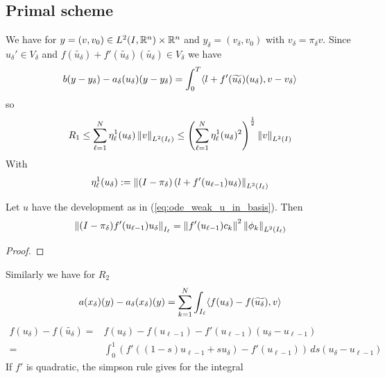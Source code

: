 \documentclass[english,12pt,a4paper]{article}
\begin{document}
\subsection{Primal scheme}\label{subsec:}
%
%
We have for $y=(v,v_0)\in L^2(I,\mathbb R^n) \times \mathbb R^n$ and $y_{\delta}=(v_{\delta},v_0)$ with $v_{\delta} = \pi_{\delta}v$. Since $u_{\delta}'\in V_{\delta}$ and $f(\widetilde{u_{\delta}}) + f'(\widetilde{u_{\delta}})(\widetilde{u_{\delta}})\in V_{\delta}$ we have
%
\begin{align*}
b(y-y_{\delta}) - a_{\delta}(u_{\delta})(y-y_{\delta}) =  \int_{0}^T\langle l  + f'(\widetilde{u_{\delta}})(u_{\delta}),v-v_{\delta}\rangle
\end{align*}
%
so
%
\begin{align*}
R_1 \le \sum_{\ell=1}^N \eta^1_{\ell}(u_{\delta})\left\|v\right\|_{L^2(I_{\ell})} \le \left(\sum_{\ell=1}^N \eta^1_{\ell}(u_{\delta})^2\right)^{\frac12}\left\|v\right\|_{L^2(I)} 
\end{align*}
%
With
%
\begin{align*}
 \eta^1_{\ell}(u_{\delta}) := \left\|(I-\pi_{\delta})\left( l + f'(u_{\ell-1})u_{\delta}\right)\right\|_{L^2(I_{\ell})}
\end{align*}
%
\begin{lemma}\label{lemma:}
Let $u$ have the development as in (\ref{eq:ode_weak_u_in_basis}). Then
%
\begin{equation}\label{eq:}
\left\|(I-\pi_{\delta})f'(u_{\ell-1})u_{\delta}\right\|_{I_{\ell}} = \left\|f'(u_{\ell-1})c_k\right\|^2 \left\|\phi_{k}\right\|_{L^2(I_{\ell})}
\end{equation}
% 
\end{lemma}
%
\begin{proof}
%
\end{proof}
%
%
Similarly we have for $R_2$
%
\begin{align*}
a(x_{\delta})(y)-a_{\delta}(x_{\delta})(y) = \sum_{k=1}^{N}\int_{I_{\ell}}\langle f(u_{\delta}) - f(\widetilde{u_{\delta}}),v\rangle
\end{align*}
%
%
\begin{align*}
f(u_{\delta}) - f(\widetilde{u_{\delta}}) =& f(u_{\delta}) - f(u_{\ell-1}) - f'(u_{\ell-1})(u_{\delta}-u_{\ell-1})\\
=& \int_0^1\left(f'((1-s)u_{\ell-1} + s u_{\delta})- f'(u_{\ell-1})\right)\,ds(u_{\delta}-u_{\ell-1})
\end{align*}
%
If $f'$ is quadratic, the simpson rule gives for the integral
\end{document}

